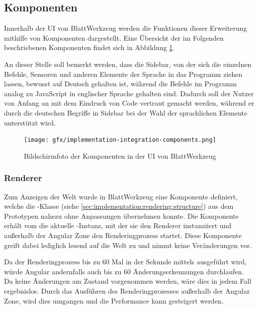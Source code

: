 \subsection{Komponenten}
\label{sec:implementation:integration:components}

Innerhalb der UI von BlattWerkzeug werden die Funktionen dieser Erweiterung mithilfe von Komponenten dargestellt. Eine Übersicht der im Folgenden beschriebenen Komponenten findet sich in Abbildung \ref{fig:implementation:integration:components}.

An dieser Stelle soll bemerkt werden, dass die Sidebar, von der sich die einzelnen Befehle, Sensoren und anderen Elemente der Sprache in das Programm ziehen lassen, bewusst auf Deutsch gehalten ist, während die Befehle im Programm analog zu JavaScript in englischer Sprache gehalten sind. Dadurch soll der Nutzer von Anfang an mit dem Eindruck von Code vertraut gemacht werden, während er durch die deutschen Begriffe in Sidebar bei der Wahl der sprachlichen Elemente unterstützt wird.

\begin{figure}
  \centering
  \texttt{[image: gfx/implementation-integration-components.png]}
  \caption{Bildschirmfoto der Komponenten in der UI von BlattWerkzeug}
  \label{fig:implementation:integration:components}
\end{figure}

\subsubsection{Renderer}
\label{sec:implementation:integration:renderer}

Zum Anzeigen der Welt wurde in BlattWerkzeug eine Komponente definiert, welche die -Klas\-se (siehe \ref{sec:implementation:rendering:structure}) aus dem Prototypen nahezu ohne Anpassungen übernehmen konnte. Die Komponente erhält vom  die aktuelle -In\-stanz, mit der sie den Renderer instanziiert und außerhalb der Angular Zone den Renderingprozess startet. Diese Komponente greift dabei lediglich lesend auf die Welt zu und nimmt keine Veränderungen vor.

Da der Renderingprozess bis zu 60 Mal in der Sekunde mittels  ausgeführt wird, würde Angular andernfalls auch bis zu 60 Änderungserkennungen durchlaufen. Da keine Änderungen am Zustand vorgenommen werden, wäre dies in jedem Fall ergebnislos. Durch das Ausführen des Renderingprozesses außerhalb der Angular Zone, wird dies umgangen und die Performance kann gesteigert werden.

